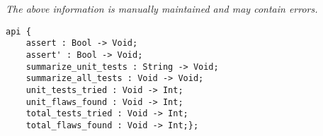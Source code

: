\label{api:Unit\_Test}

{\tiny \it The above information is manually maintained and may contain errors.}
\begin{verbatim}
api {
    assert : Bool -> Void;
    assert' : Bool -> Void;
    summarize_unit_tests : String -> Void;
    summarize_all_tests : Void -> Void;
    unit_tests_tried : Void -> Int;
    unit_flaws_found : Void -> Int;
    total_tests_tried : Void -> Int;
    total_flaws_found : Void -> Int;};
\end{verbatim}
